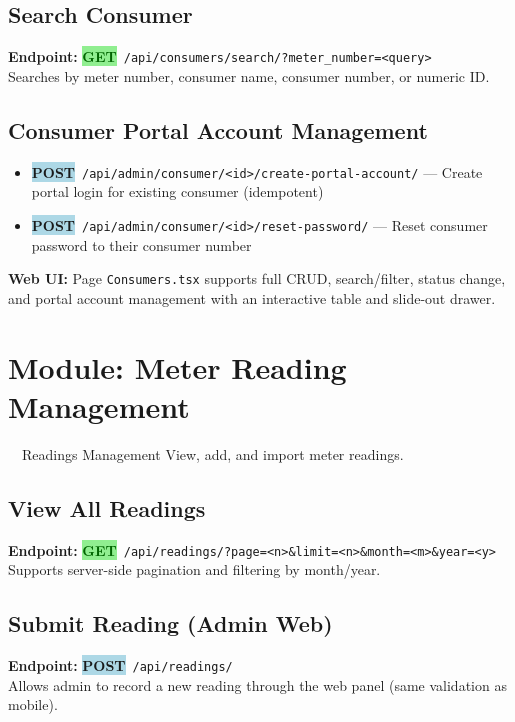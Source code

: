 \documentclass[12pt, a4paper]{report}
\newcommand{\httpget}{\colorbox{lightGreen}{\textcolor{darkGreen}{\textbf{\small GET}}}}
\newcommand{\httppost}{\colorbox{lightBlue}{\textcolor{deepBlue}{\textbf{\small POST}}}}
\newenvironment{featurelist}{%
    \begin{itemize}[leftmargin=1.5em, itemsep=2pt, parsep=0pt]
}{%
    \end{itemize}
}
\begin{document}
\subsection{Search Consumer}
\textbf{Endpoint:} \httpget\ \texttt{/api/consumers/search/?meter\_number=<query>}\\
Searches by meter number, consumer name, consumer number, or numeric ID.

\subsection{Consumer Portal Account Management}
\begin{featurelist}
    \item \httppost\ \texttt{/api/admin/consumer/<id>/create-portal-account/} — Create portal login for existing consumer (idempotent)
    \item \httppost\ \texttt{/api/admin/consumer/<id>/reset-password/} — Reset consumer password to their consumer number
\end{featurelist}

\textbf{Web UI:} Page \texttt{Consumers.tsx} supports full CRUD, search/filter, status change, and portal account management with an interactive table and slide-out drawer.

\section{Module: Meter Reading Management}

\begin{modulebox}{\faGaugeHigh\ \ Readings Management}
View, add, and import meter readings.
\end{modulebox}

\subsection{View All Readings}
\textbf{Endpoint:} \httpget\ \texttt{/api/readings/?page=<n>\&limit=<n>\&month=<m>\&year=<y>}\\
Supports server-side pagination and filtering by month/year.

\subsection{Submit Reading (Admin Web)}
\textbf{Endpoint:} \httppost\ \texttt{/api/readings/}\\
Allows admin to record a new reading through the web panel (same validation as mobile).
\end{document}
